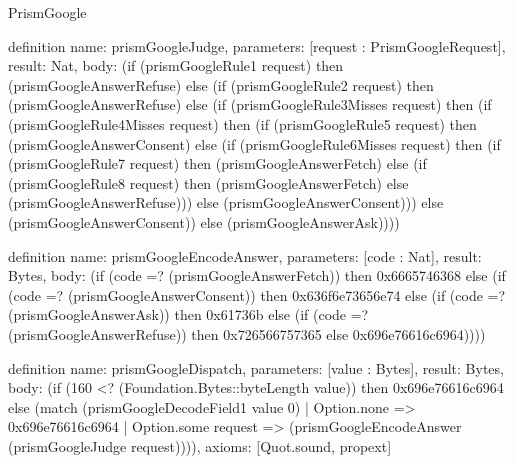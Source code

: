 \begin{lexlean}{PrismGoogle}
\begin{semanticmodule}
definition{
  name: prismGoogleJudge,
  parameters: [request : PrismGoogleRequest],
  result: Nat,
  body: (if (prismGoogleRule1 request) then (prismGoogleAnswerRefuse) else (if (prismGoogleRule2 request) then (prismGoogleAnswerRefuse) else (if (prismGoogleRule3Misses request) then (if (prismGoogleRule4Misses request) then (if (prismGoogleRule5 request) then (prismGoogleAnswerConsent) else (if (prismGoogleRule6Misses request) then (if (prismGoogleRule7 request) then (prismGoogleAnswerFetch) else (if (prismGoogleRule8 request) then (prismGoogleAnswerFetch) else (prismGoogleAnswerRefuse))) else (prismGoogleAnswerConsent))) else (prismGoogleAnswerConsent)) else (prismGoogleAnswerAsk))))
}

definition{
  name: prismGoogleEncodeAnswer,
  parameters: [code : Nat],
  result: Bytes,
  body: (if (code =? (prismGoogleAnswerFetch)) then 0x6665746368 else (if (code =? (prismGoogleAnswerConsent)) then 0x636f6e73656e74 else (if (code =? (prismGoogleAnswerAsk)) then 0x61736b else (if (code =? (prismGoogleAnswerRefuse)) then 0x726566757365 else 0x696e76616c6964))))
}

definition{
  name: prismGoogleDispatch,
  parameters: [value : Bytes],
  result: Bytes,
  body: (if (160 <? (Foundation.Bytes::byteLength value)) then 0x696e76616c6964 else (match (prismGoogleDecodeField1 value 0)
    | Option.none => 0x696e76616c6964
    | Option.some request => (prismGoogleEncodeAnswer (prismGoogleJudge request)))),
  axioms: [Quot.sound, propext]
}
\end{semanticmodule}
\end{lexlean}
